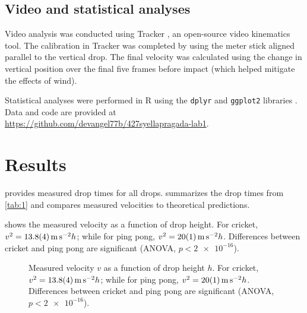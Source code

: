 \documentclass[reprint,amsmath,amssymb,aps,twoside]{revtex4-2}
\begin{document}
\subsection{Video and statistical analyses}
Video analysis was conducted using Tracker \cite{tracker, renika:2024:kinematics}, an open-source video kinematics tool. The calibration in Tracker was completed by using the meter stick aligned parallel to the vertical drop.  The final velocity was calculated using the change in vertical position over the final five frames before impact (which helped mitigate the effects of wind). %


Statistical analyses were performed in R \cite{R} using the \texttt{dplyr} and \texttt{ggplot2} libraries \cite{dplyr, ggplot2}. Data and code are provided at \url{https://github.com/devangel77b/427syellapragada-lab1}.







\section{Results}
 provides measured drop times for all drops.  summarizes the drop times from \cref{tab:1} and compares measured velocities to theoretical predictions.



 shows the measured velocity as a function of drop height. For cricket, $v^2=\qty{13.8\pm0.4}{\meter\per\second\squared}h$; while for ping pong, $v^2=\qty{20\pm1}{\meter\per\second\squared}h$. Differences between cricket and ping pong are significant (ANOVA, $p<\num{2e-16}$).
\begin{figure}
\begin{center}

\end{center}
\caption{Measured velocity $v$ as a function of drop height $h$. For cricket, $v^2=\qty{13.8\pm0.4}{\meter\per\second\squared}h$; while for ping pong, $v^2=\qty{20\pm1}{\meter\per\second\squared}h$. Differences between cricket and ping pong are significant (ANOVA, $p<\num{2e-16}$).}
\label{fig:1}
\end{figure}
\end{document}
